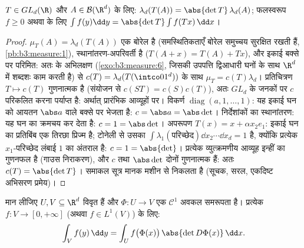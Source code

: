 \begin{theorem}[रैखिक चर परिवर्तन]
\label{thm:b3:product:linearchange}
$T \in GL_d(\R)$ और $A \in \mathcal B(\R^d)$ के लिए: $\lambda_d(T(A)) = \abs{\det T}\,\lambda_d(A)$; फलस्वरूप $f \geq 0$ अथवा  के लिए
$\int f(y)\dd y = \abs{\det T}\int f(Tx)\,\dd x$।
\end{theorem}

\begin{proof}
 $\mu_T(A) = \lambda_d(T(A))$ एक बोरेल  है (समस्थितिकताएँ बोरेल समुच्चय सुरक्षित
रखती हैं, \cref{pb:b3:measure:1}), स्थानांतरण-अपरिवर्ती है ($T(A + x) = T(A) + Tx$), और इकाई बक्से
पर परिमित: अतः  के अभिलक्षण (\cref{exo:b3:measure:6}, जिसकी उपपत्ति
द्विआधारी घनों के साथ $\R^d$ में शब्दशः काम करती है) से $c(T)
= \lambda_d(T(\intco01^d))$ के
साथ $\mu_T = c(T)\lambda_d$। प्रतिचित्रण $T \mapsto c(T)$ गुणनात्मक है (संयोजन से $c(ST) = c(S)c(T)$), अतः
$GL_d$ के जनकों पर $c$ परिकलित करना पर्याप्त है: अर्थात् प्रारंभिक
आव्यूहों पर। विकर्ण $\operatorname{diag}(a, 1, \dots, 1)$: यह इकाई घन को आयतन $\abs a$ वाले बक्से पर
भेजता है: $c = \abs a =
\abs\det$। निर्देशांकों का स्थानांतरण: यह घन का क्रमचय कर
देता है: $c
= 1 = \abs\det$। अपरूपण $T(x) = x + \alpha
x_2e_1$: इकाई घन का प्रतिबिंब एक तिरछा प्रिज्म
है; टोनेली से उसका  $\int\lambda_1(\text{परिच्छेद})\dd x_2
\cdots \dd x_d = 1$ है, क्योंकि प्रत्येक $x_1$-परिच्छेद
लंबाई $1$ का अंतराल है: $c = 1 = \abs{\det}$। प्रत्येक व्युत्क्रमणीय आव्यूह
इन्हीं का गुणनफल है (गाउस निराकरण), और $c$ तथा $\abs\det$ दोनों
गुणनात्मक हैं: अतः $c(T) = \abs{\det T}$। समाकल सूत्र मानक मशीन से निकलता है
(सूचक, सरल, एकदिष्ट अभिसरण प्रमेय)।
\end{proof}

\begin{theorem}[चर परिवर्तन]\label{thm:b3:product:changeofvar}
मान लीजिए $U, V \subseteq \R^d$ विवृत हैं और $\Phi \colon U \to V$ एक $\mathcal C^1$ अवकल समरूपता है।
प्रत्येक  $f \colon V
\to [0, +\infty]$ (अथवा $f \in L^1(V)$) के लिए:
\[
\int_V f(y)\,\dd y = \int_U
f\bigl(\Phi(x)\bigr)\,\abs{\det D\Phi(x)}\,\dd x .
\]
\end{theorem}

